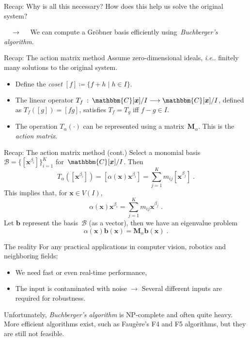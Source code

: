 \documentclass[aspectratio=169]{beamer}
\makeatletter
\newcommand{\C}{\ensuremath{\mathbbm{C}}}
\newcommand{\mat}[1]{\bm{#1}}
\DeclareRobustCommand\ie{\emph{i.e}\@ifnextchar.{}{.\@}}
\makeatother
\begin{document}
\begin{frame}{Recap: Why is all this necessary?}
How does this help us solve the original system?

$\quad\longrightarrow\quad$ We can compute a Gröbner basis efficiently using~\emph{Buchberger's algorithm}.
\end{frame}

\begin{frame}{Recap: The action matrix method}
Assume zero-dimensional ideals, \ie{} finitely many solutions to the original system.
\begin{itemize}
\item Define the \emph{coset} $[f] \coloneqq \{f+h\;|\;h\in I\}$.
\item The linear operator $T_f\::\:\C[\mat{x}]/I\longrightarrow\C[\mat{x}]/I$, defined as $T_f([g])=[fg]$,
satisfies $T_f=T_g$ iff $f-g\in I$.
\item The operation $T_\alpha(\cdot)$ can be
represented using a matrix~$\mat{M}_\alpha$. This is the \emph{action matrix}.
\end{itemize}
\end{frame}

\begin{frame}{Recap: The action matrix method (cont.)}
Select a monomial basis $\mathcal{B}=\{[\mat{x}^{\beta_i}]\}_{i=1}^K$ for~$\C[\mat{x}] / I$.
Then
\begin{equation*}
    T_\alpha([\mat{x}^{\beta_i}]) = [\alpha(\mat{x})\mat{x}^{\beta_i}] = \sum_{j=1}^Km_{ij}[\mat{x}^{\beta_j}]\;.
\end{equation*}
This implies that, for $\mat{x}\in V(I)$,
\begin{equation*}
    \alpha(\mat{x})\mat{x}^{\beta_i}=\sum_{j=1}^Km_{ij}\mat{x}^{\beta_j}\;.
\end{equation*}
Let $\mat{b}$ represent the basis~$\mathcal{B}$ (as a vector), then we have an \alert{eigenvalue problem}
\begin{equation*}
    \alpha(\mat{x})\mat{b}(\mat{x}) = \mat{M}_\alpha\mat{b}(\mat{x})\;.
\end{equation*}
\end{frame}

\begin{frame}{The reality}
For any practical applications in computer vision, robotics and neighboring fields:
\begin{itemize}
\item We need fast or even real-time performance,
\item The input is contaminated with noise $\longrightarrow$ Several different inputs are
required for robustness.
\end{itemize}

Unfortunately, \emph{Buchberger's algorithm} is NP-complete and often quite heavy. More
efficient algorithms exist, such as Faugère's F4 and F5 algorithms, but they are
still not feasible.
\end{frame}
\end{document}
